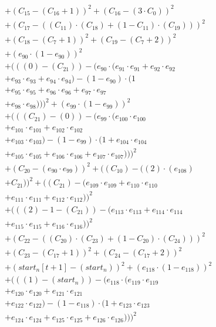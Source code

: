 \documentclass[10pt, a4paper]{article}
\begin{document}
\begin{small}
\begin{align*}
& + (C_{15} - (C_{16} + 1))^{2} + (C_{16} - (3  \cdot  C_{0}))^{2} \\
& + (C_{17} - ((C_{11})  \cdot  (C_{18}) + (1 - C_{11})  \cdot  (C_{19})))^{2} \\
& + (C_{18} - (C_{7} + 1))^{2} + (C_{19} - (C_{7} + 2))^{2} \\
& + (e_{90} \cdot (1 - e_{90}))^{2} \\
& + (((0) - (C_{21})) - (e_{90} \cdot (e_{91} \cdot e_{91} + e_{92} \cdot e_{92} \\
& + e_{93} \cdot e_{93} + e_{94} \cdot e_{94}) - (1 - e_{90}) \cdot (1 \\
& + e_{95} \cdot e_{95} + e_{96} \cdot e_{96} + e_{97} \cdot e_{97} \\
& + e_{98} \cdot e_{98})))^{2} + (e_{99} \cdot (1 - e_{99}))^{2} \\
& + (((C_{21}) - (0)) - (e_{99} \cdot (e_{100} \cdot e_{100} \\
& + e_{101} \cdot e_{101} + e_{102} \cdot e_{102} \\
& + e_{103} \cdot e_{103}) - (1 - e_{99}) \cdot (1 + e_{104} \cdot e_{104} \\
& + e_{105} \cdot e_{105} + e_{106} \cdot e_{106} + e_{107} \cdot e_{107})))^{2} \\
& + (C_{20} - (e_{90} \cdot e_{99}))^{2} + ((C_{10}) - ((2)  \cdot  (e_{108}) \\
& + C_{21}))^{2} + ((C_{21}) - (e_{109} \cdot e_{109} + e_{110} \cdot e_{110} \\
& + e_{111} \cdot e_{111} + e_{112} \cdot e_{112}))^{2} \\
& + (((2) - 1 - (C_{21})) - (e_{113} \cdot e_{113} + e_{114} \cdot e_{114} \\
& + e_{115} \cdot e_{115} + e_{116} \cdot e_{116}))^{2} \\
& + (C_{22} - ((C_{20})  \cdot  (C_{23}) + (1 - C_{20})  \cdot  (C_{24})))^{2} \\
& + (C_{23} - (C_{17} + 1))^{2} + (C_{24} - (C_{17} + 2))^{2} \\
& + (start_n[t+1] - (start_n))^{2} + (e_{118} \cdot (1 - e_{118}))^{2} \\
& + (((1) - (start_n)) - (e_{118} \cdot (e_{119} \cdot e_{119} \\
& + e_{120} \cdot e_{120} + e_{121} \cdot e_{121} \\
& + e_{122} \cdot e_{122}) - (1 - e_{118}) \cdot (1 + e_{123} \cdot e_{123} \\
& + e_{124} \cdot e_{124} + e_{125} \cdot e_{125} + e_{126} \cdot e_{126})))^{2} \\

\end{align*}
\end{small}
\end{document}
